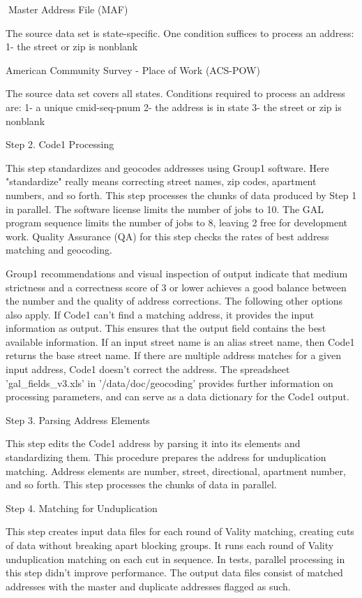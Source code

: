 Master Address File (MAF)

The source data set is state-specific. One condition suffices to process an address:
1-   the street or zip is nonblank

American Community Survey - Place of Work (ACS-POW)

The source data set covers all states. Conditions required to process an address are:
1-   a unique cmid-seq-pnum
2-   the address is in state
3-   the street or zip is nonblank

                    Step 2. Code1 Processing

This step standardizes and geocodes addresses using Group1 software. Here "standardize" really means
correcting street names, zip codes, apartment numbers, and so forth. This step processes the chunks of
data produced by Step 1 in parallel. The software license limits the number of jobs to 10. The GAL
program sequence limits the number of jobs to 8, leaving 2 free for development work. Quality
Assurance (QA) for this step checks the rates of best address matching and geocoding. 

Group1 recommendations and visual inspection of output indicate that medium strictness and a
correctness score of 3 or lower achieves a good balance between the number and the quality of address
corrections.  The following other options also apply. If Code1 can't find a matching address, it provides
the input information as output. This ensures that the output field contains the best available information.
If an input street name is an alias street name, then Code1 returns the base street name. If there are
multiple address matches for a given input address, Code1 doesn't correct the address. The spreadsheet
'gal_fields_v3.xls' in '/data/doc/geocoding' provides further information on processing parameters, and
can serve as a data dictionary for the Code1 output. 

                Step 3. Parsing Address Elements

This step edits the Code1 address by parsing it into its elements and standardizing them.  This procedure
prepares the address for unduplication matching. Address elements are number, street, directional,
apartment number, and so forth. This step processes the chunks of data in parallel. 

               Step 4. Matching for Unduplication

This step creates input data files for each round of Vality matching, creating cuts of data without
breaking apart blocking groups. It runs each round of Vality unduplication matching on each cut in
sequence. In tests, parallel processing in this step didn't improve performance. The output data files
consist of matched addresses with the master and duplicate addresses flagged as such.

